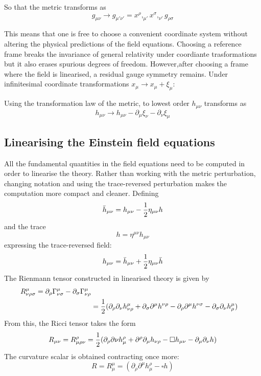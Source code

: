 \documentclass[binding=0.6cm, LaM]{sapthesis}
\begin{document}
So that the metric transforms as 
\begin{equation}
g_{\mu\nu} \rightarrow g_{\mu' \nu'} = x^{\rho},_{\mu'}x^{\sigma},_{\nu'}g_{\rho \sigma}
\end{equation}


This means that one is free to choose a convenient coordinate system without altering the physical predictions of the field equations. Choosing a reference frame breaks the invariance of general relativity under coordiante trasformations but it also erases spurious degrees of freedom.
However,after choosing a frame where the field is linearised, a residual gauge symmetry remains. Under infinitesimal coordinate transformations
 $x_{\mu} \rightarrow x_{\mu} + \xi_{\mu}$:

Using the transformation law of the metric, to lowest order $h_{\mu\nu}$ transforms as
\[
h_{\mu\nu} \rightarrow h_{\mu\nu} - \partial_{\mu}\xi_{\nu} - \partial_{\nu}\xi_{\mu}
\]
\subsection{Linearising the Einstein field equations}
All the fundamental quantities in the field equations need to be computed in order to linearise the theory. Rather than working with the metric perturbation, changing notation and using the trace-reversed perturbation makes the computation more compact and cleaner. Defining 
\begin{equation}
{\bar h}_{\mu\nu} = h_{\mu\nu} - {1 \over {2}}\eta_{\mu\nu}h  
\end{equation}
and the trace 
\begin{equation}
h = \eta^{\mu\nu}h_{\mu\nu}
\end{equation}
expressing the trace-reversed field:
\begin{equation}
h_{\mu\nu} = {\bar h}_{\mu\nu} + {1 \over {2}}\eta_{\mu\nu}{\bar h}
\end{equation} 
The Rienmann tensor constructed in linearised theory is given by
\begin{align}
R^{\mu}_{\nu\rho\sigma} = \partial_{\rho} \Gamma^{\mu}_{\nu\sigma} - \partial_{\sigma}\Gamma^{\mu}_{\nu\rho}  \\
&={ 1 \over 2} (\partial_{\rho}\partial_{\nu}h^{\mu}_{\nu\rho} + \partial_{\sigma}\partial^{\mu}h^{\nu\rho} - \partial_{\rho}\partial^{\mu}h^{\nu\sigma} - \partial_{\sigma}\partial_{\nu}h^{\mu}_{\rho})
\end{align}
From this, the Ricci tensor takes the form
\begin{equation}
R_{\mu\nu} = R^{\rho}_{\mu\rho\nu} = {1 \over 2}(\partial_{\rho}\partial{\nu}h^{\rho}_{\mu} + \partial^{\rho}\partial_{\mu}h_{\nu\rho} - \square h_{\mu\nu} - \partial_{\mu}\partial_{\nu}h)
\end{equation}
The curvature scalar is obtained contracting once more:
\begin{equation}
R = R^{\mu}_{\mu} = (\partial_{\rho}\partial^{\mu}h^{\rho}_{\mu} - \square h)
\end{equation}
\end{document}
